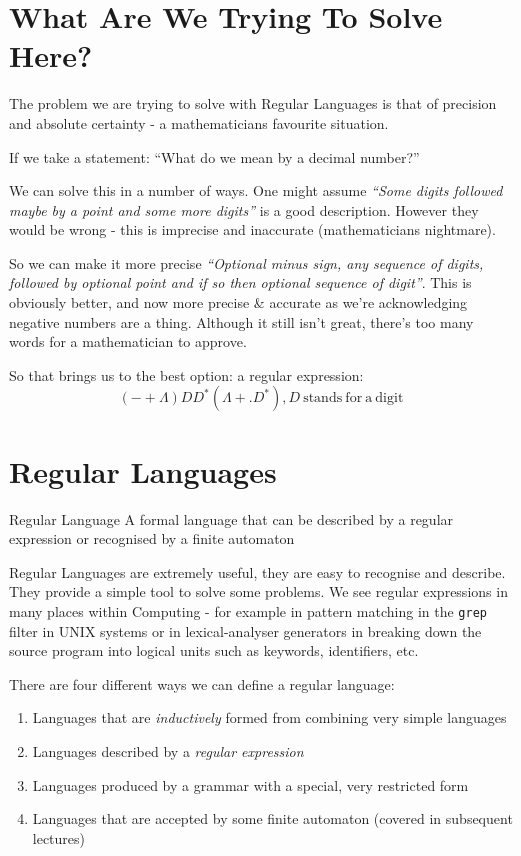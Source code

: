 
\section{What Are We Trying To Solve Here?}
The problem we are trying to solve with Regular Languages is that of precision and absolute certainty - a mathematicians favourite situation.

If we take a statement: ``What do we mean by a decimal number?''

We can solve this in a number of ways. One might assume \textit{``Some digits followed maybe by a point and some more digits''} is a good description. However they would be wrong - this is imprecise and inaccurate (mathematicians nightmare). 

So we can make it more precise \textit{``Optional minus sign, any sequence of digits, followed by optional point and if so then optional sequence of digit''}. This is obviously better, and now more precise \& accurate as we're acknowledging negative numbers are a thing. Although it still isn't great, there's too many words for a mathematician to approve.

So that brings us to the best option: a regular expression:
\[(-+\Lambda) D D^* (\Lambda + .D^*), D \mathrm{\ stands\ for\ a\ digit}\]

\section{Regular Languages}
\begin{define}
    \item[Regular Language] A formal language that can be described by a regular expression or recognised by a finite automaton
\end{define}

Regular Languages are extremely useful, they are easy to recognise and describe. They provide a simple tool to solve some problems. We see regular expressions in many places within Computing - for example in pattern matching in the \verb|grep| filter in UNIX systems or in lexical-analyser generators in breaking down the source program into logical units such as keywords, identifiers, etc.

There are four different ways we can define a regular language:
\begin{enumerate}
    \item Languages that are \textit{inductively} formed from combining very simple languages
    \item Languages described by a \textit{regular expression}
    \item Languages produced by a grammar with a special, very restricted form
    \item Languages that are accepted by some finite automaton (covered in subsequent lectures)
\end{enumerate}

